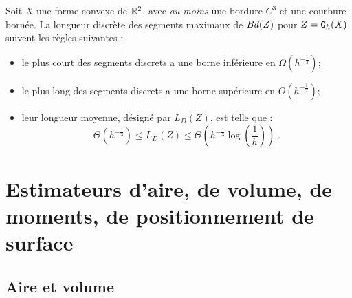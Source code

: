\begin{lemma}
  \label{lem-asymptotic-digital-length-ms}
   Soit $X$ une forme convexe de $\mathbb{R}^2$, avec \emph{au moins} une
   bordure $C^3$  et une courbure bornée.  La longueur discrète des
   segments maximaux de $Bd({Z})$ pour $Z=\mathtt{G}_{h}(X)$ suivent les règles suivantes :
   \begin{itemize}
   \item le plus court des segments discrets a une borne inférieure en
     $\Omega(h^{-\frac{1}{3}})$;
   \item le plus long des segments discrets a une borne supérieure en
     $O(h^{-\frac{1}{2}})$;
   \item leur longueur moyenne, désigné par $L_D({Z})$, est telle que :
  \begin{equation}
    \label{eq:lengthMS}
    \Theta(h^{-\frac{1}{3}}) \le L_D( {Z} ) \le \Theta(h^{-\frac{1}{3}} \log \left(\frac{1}{h}\right))\;.
  \end{equation}
   \end{itemize}
\end{lemma}
%
\section{Estimateurs d'aire, de volume, de moments, de positionnement de surface}
%
\subsection{Aire et volume}
%
